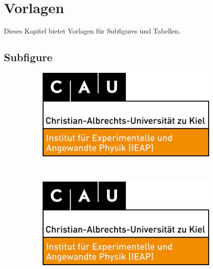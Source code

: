 \chapter{Vorlagen}\label{chap:Vorlagen}
Dieses Kapitel bietet Vorlagen für Subfigures und Tabellen.

\section{Subfigure}
\begin{figure}[H] %
    \begin{subfigure}{.45\linewidth}
        \centering
        \includegraphics[width=\linewidth]{./Bilder/MathFak.png}
        \caption{\label{fig:part_a}}
    \end{subfigure}%
    \\
    \begin{subfigure}{.275\linewidth}
        \centering
        \includegraphics[width=\linewidth]{./Bilder/MathFak.png}
        \caption{\label{fig:part_b}}
    \end{subfigure}%
    \hfill %
    \begin{subfigure}{.275\linewidth}
        \centering

\end{subfigure}
\end{figure}
